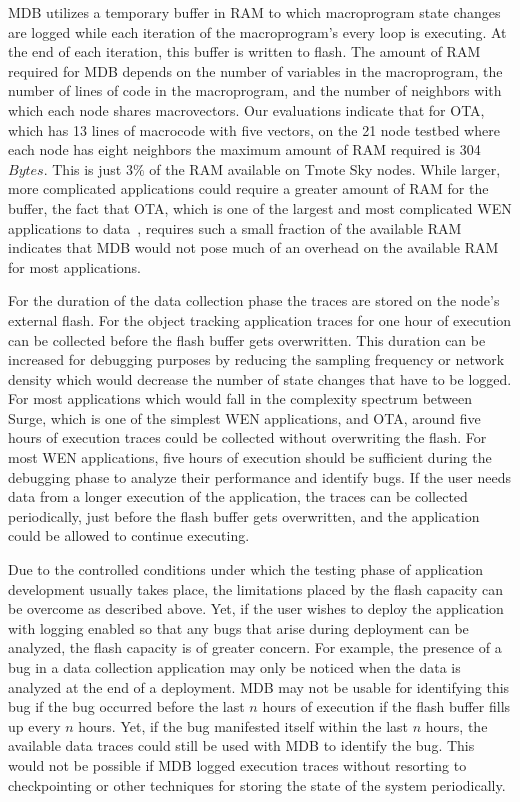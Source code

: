 MDB utilizes a temporary buffer in RAM to which macroprogram state changes are
logged while each iteration of the macroprogram's every loop is executing. At
the end of each iteration, this buffer is written to flash. The amount of RAM
required for MDB depends on the number of variables in the macroprogram, the
number of lines of code in the macroprogram, and the number of neighbors with
which each node shares macrovectors. Our evaluations indicate that for OTA,
which has 13 lines of macrocode with five vectors, on the 21 node testbed where
each node has eight neighbors the maximum amount of RAM required is 304
$Bytes$. This is just $3\%$ of the RAM available on Tmote Sky nodes. While
larger, more complicated applications could require a greater amount of RAM for
the buffer, the fact that OTA, which is one of the largest and most complicated
WEN applications to data~\cite{Whitehousea}, requires such a small fraction of
the available RAM indicates that MDB would not pose much of an overhead on the
available RAM for most applications.

For the duration of the data collection phase the traces are stored on the
node's external flash. For the object tracking application traces for one hour
of execution can be collected before the flash buffer gets overwritten. This
duration can be increased for debugging purposes by reducing the sampling
frequency or network density which would decrease the number of state changes
that have to be logged. For most applications which would fall in the complexity
spectrum between Surge, which is one of the simplest WEN applications, and OTA,
around five hours of execution traces could be collected without overwriting the
flash. For most WEN applications, five hours of execution should be sufficient
during the debugging phase to analyze their performance and identify bugs. If
the user needs data from a longer execution of the application, the traces can
be collected periodically, just before the flash buffer gets overwritten, and
the application could be allowed to continue executing.

Due to the controlled conditions under which the testing phase of application
development usually takes place, the limitations placed by the flash capacity
can be overcome as described above. Yet, if the user wishes to deploy the
application with logging enabled so that any bugs that arise during deployment
can be analyzed, the flash capacity is of greater concern. For example, the
presence of a bug in a data collection application may only be noticed when the
data is analyzed at the end of a deployment. MDB may not be usable for
identifying this bug if the bug occurred before the last $n$ hours of execution
if the flash buffer fills up every $n$ hours. Yet, if the bug manifested itself
within the last $n$ hours, the available data traces could still be used with
MDB to identify the bug. This would not be possible if MDB logged execution
traces without resorting to checkpointing or other techniques for storing the
state of the system periodically.

